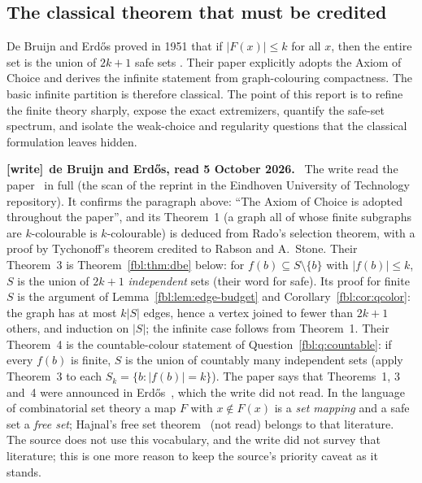 \documentclass[11pt]{article}
\theoremstyle{definition}
\theoremstyle{remark}
\newenvironment{writenote}[1][]{\par\smallskip\begingroup\small
 \noindent\textbf{[write]}\if\relax\detokenize{#1}\relax\else~\textbf{#1.}\fi\ }%
 {\par\endgroup\smallskip}
\begin{document}
\subsection{The classical theorem that must be credited}\label{fbl:sec:dbe-credit}
De Bruijn and Erd\H{o}s proved in 1951 that if $\lvert F(x)\rvert\le k$ for
all $x$, then the entire set is the union of $2k+1$ safe sets
\cite{deBruijnErdos}.  Their paper explicitly adopts the Axiom of Choice and
derives the infinite statement from graph-colouring compactness.  The basic
infinite partition is therefore classical.  The point of this report is to
refine the finite theory sharply, expose the exact extremizers, quantify the
safe-set spectrum, and isolate the weak-choice and regularity questions that
the classical formulation leaves hidden.

\begin{writenote}[de Bruijn and Erd\H{o}s, read 5 October 2026]
The write read the paper~\cite{deBruijnErdos} in full (the scan of the
reprint in the Eindhoven University of Technology repository). It confirms
the paragraph above: ``The Axiom of Choice is adopted throughout the
paper'', and its Theorem~1 (a graph all of whose finite subgraphs are
$k$-colourable is $k$-colourable) is deduced from Rado's selection theorem,
with a proof by Tychonoff's theorem credited to Rabson and A.~Stone. Their
Theorem~3 is Theorem~\ref{fbl:thm:dbe} below: for $f(b)\subseteq S\setminus
\{b\}$ with $\lvert f(b)\rvert\le k$, $S$ is the union of $2k+1$
\emph{independent} sets (their word for safe). Its proof for finite $S$ is
the argument of Lemma~\ref{fbl:lem:edge-budget} and
Corollary~\ref{fbl:cor:qcolor}: the graph has at most $k\lvert S\rvert$
edges, hence a vertex joined to fewer than $2k+1$ others, and induction on
$\lvert S\rvert$; the infinite case follows from Theorem~1. Their Theorem~4
is the countable-colour statement of Question~\ref{fbl:q:countable}: if every
$f(b)$ is finite, $S$ is the union of countably many independent sets
(apply Theorem~3 to each $S_k=\{b:\lvert f(b)\rvert=k\}$). The paper says that
Theorems~1, 3 and~4 were announced in Erd\H{o}s~\cite{Erdos1950}, which the
write did not read. In the language of combinatorial set theory a map $F$
with $x\notin F(x)$ is a \emph{set mapping} and a safe set a \emph{free
set}; Hajnal's free set theorem~\cite{Hajnal} (not read) belongs to that
literature. The source does not use this vocabulary, and the write did not
survey that literature; this is one more reason to keep the source's
priority caveat as it stands.
\end{writenote}
\end{document}
